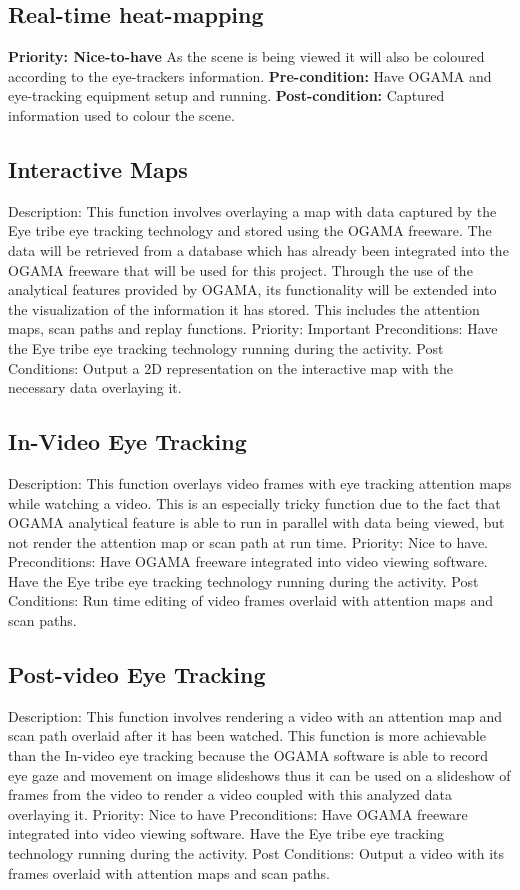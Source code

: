 \subsection{Real-time heat-mapping}
    \textbf{Priority: Nice-to-have}\newline
    As the scene is being viewed it will also be coloured according to the eye-trackers information.\newline
    \textbf{Pre-condition: }
    Have OGAMA and eye-tracking equipment setup and running.\newline
    \textbf{Post-condition: }
    Captured information used to colour the scene.
\subsection{Interactive Maps}
Description: This function involves overlaying a map with data captured by the Eye tribe eye tracking technology and stored using the OGAMA freeware. The data will be retrieved from a database which has already been integrated into the OGAMA freeware that will be used for this project. Through the use of the analytical features provided by OGAMA, its functionality will be extended into the visualization of the information it has stored. This includes the attention maps, scan paths and replay functions.
Priority: Important
Preconditions: Have the Eye tribe eye tracking technology running during the activity.     
Post Conditions: Output a 2D representation on the interactive map with the necessary data overlaying it. 
\subsection{In-Video Eye Tracking}
Description:  This function overlays video frames with eye tracking attention maps while watching a video. This is an especially tricky function due to the fact that OGAMA analytical feature is able to run in parallel with data being viewed, but not render the attention map or scan path at run time.
Priority: Nice to have.
Preconditions: Have OGAMA freeware integrated into video viewing software. Have the Eye tribe eye tracking technology running during the activity.
Post Conditions: Run time editing of video frames overlaid with attention maps and scan paths.
\subsection{Post-video Eye Tracking}
Description: This function involves rendering a video with an attention map and scan path overlaid after it has been watched. This function is more achievable than the In-video eye tracking because the OGAMA software is able to record eye gaze and movement on image slideshows thus it can be used on a slideshow of frames from the video to render a video coupled with this analyzed data overlaying it.  
Priority: Nice to have
Preconditions: Have OGAMA freeware integrated into video viewing software. Have the Eye tribe eye tracking technology running during the activity.    
Post Conditions: Output a video with its frames overlaid with attention maps and scan paths.
